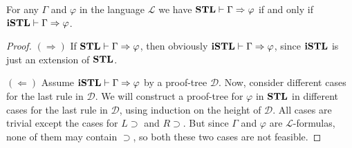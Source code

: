 \begin{thm}
  For any $\Gamma$ and $\varphi$ in the language $\mathcal{L}$ we have $\mathbf{STL} \vdash \Gamma \Rightarrow \varphi$ if and only if $\mathbf{iSTL} \vdash \Gamma \Rightarrow \varphi$.
\end{thm}
\begin{proof}
  $(\Rightarrow)$ If $\mathbf{STL} \vdash \Gamma \Rightarrow \varphi$, then obviously $\mathbf{iSTL} \vdash \Gamma \Rightarrow \varphi$, since $\mathbf{iSTL}$ is just an extension of $\mathbf{STL}$.

  $(\Leftarrow)$ Assume $\mathbf{iSTL} \vdash \Gamma \Rightarrow \varphi$ by a proof-tree $\mathcal{D}$. Now, consider different cases for the last rule in $\mathcal{D}$. We will construct a proof-tree for $\varphi$ in $\mathbf{STL}$ in different cases for the last rule in $\mathcal{D}$, using induction on the height of $\mathcal{D}$. All cases are trivial except the cases for $L \supset$ and $R \supset$. But since $\Gamma$ and $\varphi$ are $\mathcal{L}$-formulas, none of them may contain $\supset$, so both these two cases are not feasible.
\end{proof}